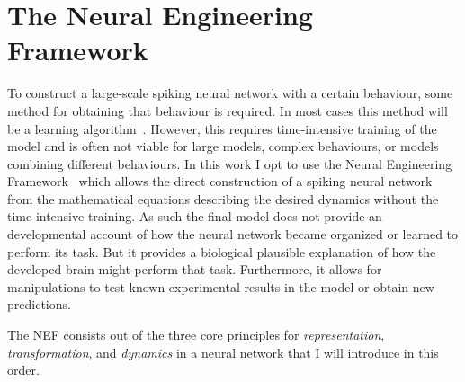 \chapter{The Neural Engineering Framework}\label{sec:nef}

To construct a large-scale spiking neural network with a certain behaviour, some method for obtaining that behaviour is required.
In most cases this method will be a learning algorithm~\parencite[e.g.,][]{oreilly2006}.
However, this requires time-intensive training of the model and is often not viable for large models, complex behaviours, or models combining different behaviours.
In this work I opt to use the Neural Engineering Framework~\parencite[NEF;][]{eliasmith2003} which allows the direct construction of a spiking neural network from the mathematical equations describing the desired dynamics without the time-intensive training.
As such the final model does not provide an developmental account of how the neural network became organized or learned to perform its task.
But it provides a biological plausible explanation of how the developed brain might perform that task.
Furthermore, it allows for manipulations to test known experimental results in the model or obtain new predictions.

The NEF consists out of the three core principles for \emph{representation}, \emph{transformation}, and \emph{dynamics} in a neural network that I will introduce in this order.

